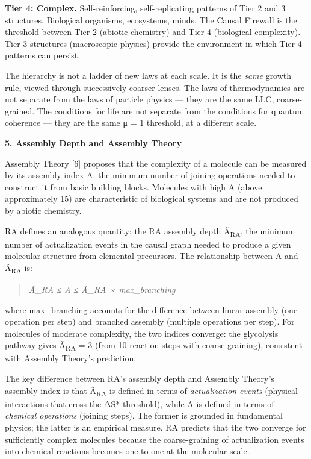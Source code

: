 \documentclass[12pt,a4paper]{article}
\begin{document}
\textbf{Tier 4: Complex.} Self-reinforcing, self-replicating patterns of
Tier 2 and 3 structures. Biological organisms, ecosystems, minds. The
Causal Firewall is the threshold between Tier 2 (abiotic chemistry) and
Tier 4 (biological complexity). Tier 3 structures (macroscopic physics)
provide the environment in which Tier 4 patterns can persist.

The hierarchy is not a ladder of new laws at each scale. It is the
\emph{same} growth rule, viewed through successively coarser lenses. The
laws of thermodynamics are not separate from the laws of particle
physics --- they are the same LLC, coarse-grained. The conditions for
life are not separate from the conditions for quantum coherence --- they
are the same μ = 1 threshold, at a different scale.

\textbf{5. Assembly Depth and Assembly Theory}

Assembly Theory {[}6{]} proposes that the complexity of a molecule can
be measured by its assembly index A: the minimum number of joining
operations needed to construct it from basic building blocks. Molecules
with high A (above approximately 15) are characteristic of biological
systems and are not produced by abiotic chemistry.

RA defines an analogous quantity: the RA assembly depth
Ã\textsubscript{RA}, the minimum number of actualization events in the
causal graph needed to produce a given molecular structure from
elemental precursors. The relationship between A and Ã\textsubscript{RA}
is:

\begin{quote}
\emph{Ã\_RA ≤ A ≤ Ã\_RA × max\_branching}
\end{quote}

where max\_branching accounts for the difference between linear assembly
(one operation per step) and branched assembly (multiple operations per
step). For molecules of moderate complexity, the two indices converge:
the glycolysis pathway gives Ã\textsubscript{RA} = 3 (from 10 reaction
steps with coarse-graining), consistent with Assembly Theory's
prediction.

The key difference between RA's assembly depth and Assembly Theory's
assembly index is that Ã\textsubscript{RA} is defined in terms of
\emph{actualization events} (physical interactions that cross the ΔS*
threshold), while A is defined in terms of \emph{chemical operations}
(joining steps). The former is grounded in fundamental physics; the
latter is an empirical measure. RA predicts that the two converge for
sufficiently complex molecules because the coarse-graining of
actualization events into chemical reactions becomes one-to-one at the
molecular scale.
\end{document}
